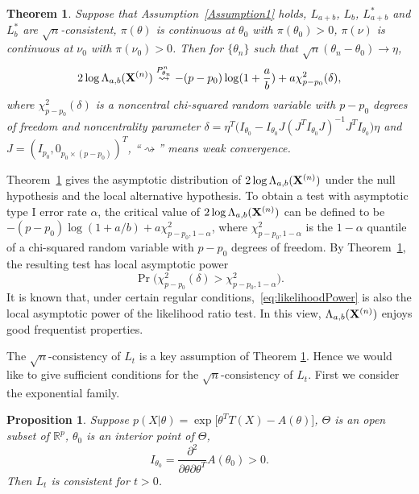 \documentclass[11pt]{article}
\theoremstyle{plain}
\newtheorem{theorem}{\quad\quad Theorem}
\newtheorem{proposition}{\quad\quad Proposition}
\theoremstyle{definition}
\theoremstyle{remark}
\begin{document}
    \begin{theorem}\label{Thm:maintheorem}
        Suppose that Assumption~\ref{Assumption1} holds, $L_{a+b}$, $L_b$, $L_{a+b}^*$ and $L_b^*$ are $\sqrt{n}$-consistent, $\pi(\theta)$ is continuous at $\theta_0$ with $\pi(\theta_0)>0$, $\pi(\nu)$ is continuous at $\nu_0$ with $\pi(\nu_0)>0$. Then for $\{\theta_n\}$ such that $\sqrt{n}(\theta_n-\theta_0)\to \eta$, 
        $$
        2\log \Lambda_{a,b}(\mathbf{X}^{(n)})\overset{P^n_{\theta_n}}{\rightsquigarrow}-{(p-p_0)}\log (1+\frac{a}{b})+{a}\chi^2_{p-p_0}(\delta),
        $$
        where $\chi^2_{p-p_0}(\delta)$ is a noncentral chi-squared random variable with $p-p_0$ degrees of freedom and noncentrality parameter $\delta=\eta^T\big( I_{\theta_0}-I_{\theta_0} J(J^T I_{\theta_0} J)^{-1}J^T I_{\theta_0}\big)\eta$ and $J=(I_{p_0},0_{p_0\times(p-p_0)})^T$,
``$\rightsquigarrow$'' means weak convergence.
    \end{theorem}
Theorem~\ref{Thm:maintheorem} gives the asymptotic distribution of $2\log \Lambda_{a,b}(\mathbf{X}^{(n)})$ under the null hypothesis and the local alternative hypothesis.
To obtain a test with asymptotic type I error rate $\alpha$, the critical value of $2\log \Lambda_{a,b}(\mathbf{X}^{(n)})$ can be defined to be $-(p-p_0)\log (1+a/b)+ a\chi^2_{p-p_0,1-\alpha}$, where $\chi^2_{p-p_0,1-\alpha}$ is the $1-\alpha$ quantile of a chi-squared random variable with $p-p_0$ degrees of freedom.
By Theorem~\ref{Thm:maintheorem}, the resulting test has local asymptotic power
\begin{equation}\label{eq:likelihoodPower}
\Pr \big( \chi^2_{p-p_0}(\delta)> \chi^2_{p-p_0,1-\alpha} \big).
\end{equation}
It is known that, under certain regular conditions,~\eqref{eq:likelihoodPower} is also the local asymptotic power of the likelihood ratio test. 
In this view, $\Lambda_{a,b}(\mathbf{X}^{(n)})$ enjoys good frequentist properties.


 The $\sqrt{n}$-consistency of $L_t$ is a key assumption of Theorem \ref{Thm:maintheorem}.
Hence we would like to give sufficient conditions for the $\sqrt{n}$-consistency of $L_t$.
 First we consider the exponential family.
\begin{proposition}\label{exponentialCon}
    Suppose $p(X|\theta)=\exp\big[\theta^T T(X)-A(\theta)\big]$, $\Theta$ is an open subset of $\mathbb{R}^p$, $\theta_0$ is an interior point of $\Theta$, 
    $$I_{\theta_0}=\frac{\partial^2}{\partial \theta \partial \theta^T} A(\theta_0)>0.$$
    Then $L_{t}$ is consistent for $t>0$.
\end{proposition}
\end{document}
